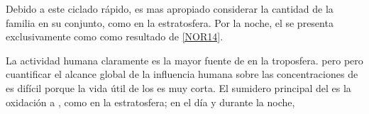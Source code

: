 Debido a este ciclado rápido, es mas apropiado considerar la cantidad de la familia   en su conjunto, como en la estratosfera. Por la noche, el   se presenta exclusivamente como  como resultado de \ref{NOR14}.

La actividad humana claramente es la mayor fuente de  en la troposfera. pero  pero cuantificar el alcance global de la influencia humana sobre las concentraciones de  es difícil porque la vida útil de los  es muy corta. El sumidero principal del  es la oxidación a , como en la estratosfera; en el día 
y durante la noche,

